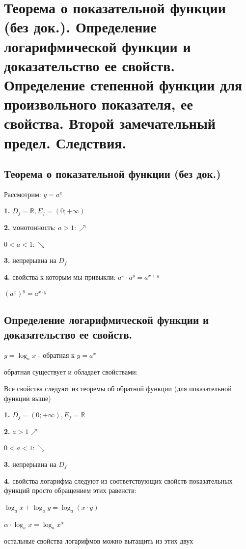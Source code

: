 \section{Теорема о показательной функции (без док.). Определение логарифмической функции и доказательство ее свойств. Определение степенной функции для произвольного показателя, ее свойства. Второй замечательный предел. Следствия.}

\subsection{Теорема о показательной функции (без док.)}

\begin{theorem}
Рассмотрим: $y=a^x$

\textbf{1.} $D_f = \mathbb{R}, E_f = (0; +\infty)$

\textbf{2.} монотонность:
$a > 1: \nearrow$

$0 < a < 1: \searrow$

\textbf{3.} непрерывна на $D_f$

\textbf{4.} свойства к которым мы привыкли: $a^x \cdot a^y = a^{x+y}$

$(a^x)^y=a^{x\cdot y}$

\end{theorem}

\subsection{Определение логарифмической функции и доказательство ее свойств.}

\begin{theorem}
$y = \log_{a} x $ - обратная к $y=a^x$

обратная существует и обладает свойствами:

Все свойства следуют из теоремы об обратной функции (для показательной функции выше)

\textbf{1.} $D_f = (0; +\infty), E_f = \mathbb{R}$

\textbf{2.} $a>1 \nearrow$

$0<a<1: \searrow$

\textbf{3.} непрерывна на $D_f$

\textbf{4.} свойства логарифма следуют из соответствующих свойств показательных функций просто обращением этих равенств:

$\log_a x + \log_a y = \log_a (x \cdot y)$

$\alpha \cdot \log_a x = \log_a x^{\alpha}$

остальные свойства логарифмов можно вытащить из этих двух

\end{theorem}


